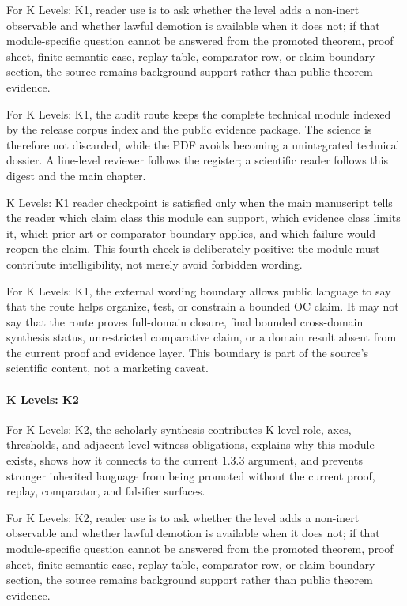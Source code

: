 For K Levels: K1, reader use is to ask whether the level adds a non-inert observable and whether lawful demotion is available when it does not; if that module-specific question cannot be answered from the promoted theorem, proof sheet, finite semantic case, replay table, comparator row, or claim-boundary section, the source remains background support rather than public theorem evidence.


For K Levels: K1, the audit route keeps the complete technical module indexed by the release corpus index and the public evidence package. The science is therefore not discarded, while the PDF avoids becoming a unintegrated technical dossier. A line-level reviewer follows the register; a scientific reader follows this digest and the main chapter.


K Levels: K1 reader checkpoint is satisfied only when the main manuscript tells the reader which claim class this module can support, which evidence class limits it, which prior-art or comparator boundary applies, and which failure would reopen the claim. This fourth check is deliberately positive: the module must contribute intelligibility, not merely avoid forbidden wording.


For K Levels: K1, the external wording boundary allows public language to say that the route helps organize, test, or constrain a bounded OC claim. It may not say that the route proves full-domain closure, final bounded cross-domain synthesis status, unrestricted comparative claim, or a domain result absent from the current proof and evidence layer. This boundary is part of the source's scientific content, not a marketing caveat.


\paragraph{K Levels: K2}

For K Levels: K2, the scholarly synthesis contributes K-level role, axes, thresholds, and adjacent-level witness obligations, explains why this module exists, shows how it connects to the current 1.3.3 argument, and prevents stronger inherited language from being promoted without the current proof, replay, comparator, and falsifier surfaces.


For K Levels: K2, reader use is to ask whether the level adds a non-inert observable and whether lawful demotion is available when it does not; if that module-specific question cannot be answered from the promoted theorem, proof sheet, finite semantic case, replay table, comparator row, or claim-boundary section, the source remains background support rather than public theorem evidence.


